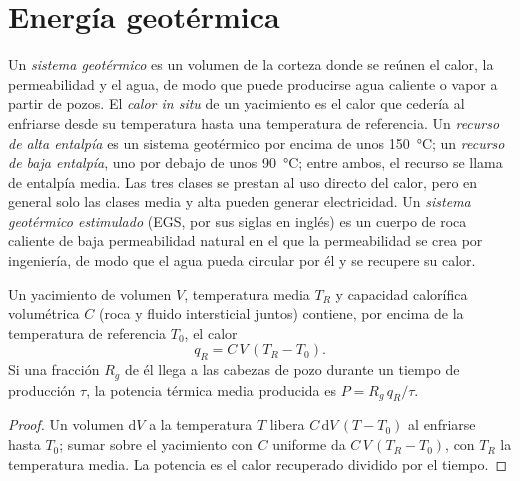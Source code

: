 \section{Energía geotérmica}\label{sec:b2:energy-geology:geothermal}

\begin{definition}\label{def:b2:energy-geology:geothermal}
Un \emph{sistema geotérmico} es un volumen de la corteza donde se reúnen el calor,
la permeabilidad y el agua, de modo que puede producirse agua caliente o vapor a partir de pozos. El
\emph{calor in situ} de un yacimiento es el calor que cedería al enfriarse
desde su temperatura hasta una temperatura de referencia. Un \emph{recurso de alta entalpía}
es un sistema geotérmico por encima de unos \qty{150}{\celsius}; un \emph{recurso de baja
entalpía}, uno por debajo de unos \qty{90}{\celsius}; entre ambos, el
recurso se llama de entalpía media. Las tres clases se prestan al uso directo del calor, pero en general solo las clases media
y alta pueden generar electricidad. Un \emph{sistema geotérmico estimulado} (EGS, por sus siglas en inglés) es un cuerpo de
roca caliente de baja permeabilidad natural en el que la permeabilidad se crea por ingeniería, de modo que el agua
pueda circular por él y se recupere su calor.
\end{definition}

\begin{proposition}\label{prop:b2:energy-geology:heat}
Un yacimiento de volumen $V$, temperatura media $T_R$ y capacidad calorífica volumétrica $C$ (roca y fluido
intersticial juntos) contiene, por encima de la temperatura de referencia $T_0$, el calor
\begin{equation}
q_R = C\,V\,(T_R - T_0) .
\label{eq:b2:energy-geology:heat}
\end{equation}
Si una fracción $R_g$ de él llega a las cabezas de pozo durante un tiempo de producción $\tau$, la potencia
térmica media producida es $P = R_g\,q_R/\tau$.
\end{proposition}

\begin{proof}
Un volumen $\mathrm{d}V$ a la temperatura $T$ libera $C\,\mathrm{d}V\,(T - T_0)$ al enfriarse hasta $T_0$;
sumar sobre el yacimiento con $C$ uniforme da $C\,V\,(T_R - T_0)$, con $T_R$ la temperatura
media. La potencia es el calor recuperado dividido por el tiempo.
\end{proof}

